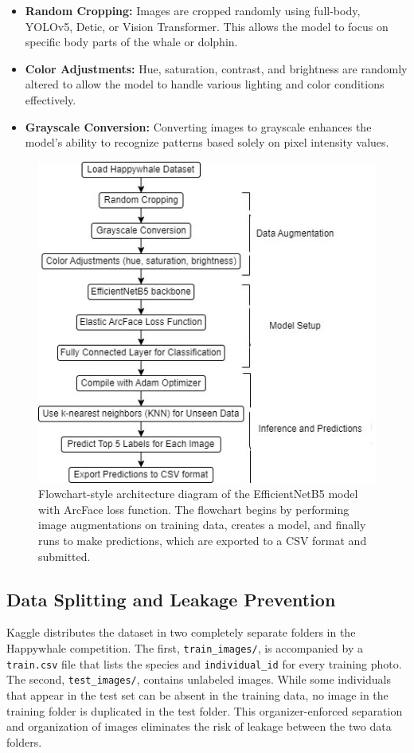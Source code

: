\documentclass[twocolumn]{article}
\begin{document}
\begin{itemize}
    \item \textbf{Random Cropping:} Images are cropped randomly using full-body, YOLOv5, Detic, or Vision Transformer. This allows the model to focus on specific body parts of the whale or dolphin.
    \item \textbf{Color Adjustments:} Hue, saturation, contrast, and brightness are randomly altered to allow the model to handle various lighting and color conditions effectively.
    \item \textbf{Grayscale Conversion:} Converting images to grayscale enhances the model’s ability to recognize patterns based solely on pixel intensity values. 
\end{itemize}

\begin{figure}
    \centering
    \includegraphics[width=0.7\linewidth]{model3.jpg}
    \caption{Flowchart-style architecture diagram of the EfficientNetB5 model with ArcFace loss function. The flowchart begins by performing image augmentations on training data, creates a model, and finally runs to make predictions, which are exported to a CSV format and submitted.}
\end{figure}

\subsection{Data Splitting and Leakage Prevention}

Kaggle distributes the dataset in two completely separate folders in the Happywhale competition. The first, \texttt{train\_images/}, is accompanied by a \texttt{train.csv} file that lists the species and \texttt{individual_id} for every training photo. The second, \texttt{test_images/}, contains unlabeled images. While some individuals that appear in the test set can be absent in the training data, no image in the training folder is duplicated in the test folder. This organizer-enforced separation and organization of images eliminates the risk of leakage between the two data folders.  
\end{document}
